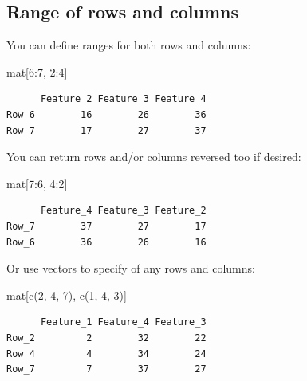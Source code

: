 \documentclass[
]{book}
\newenvironment{Shaded}{\begin{snugshade}}{\end{snugshade}}
\newcommand{\DecValTok}[1]{\textcolor[rgb]{0.00,0.00,0.81}{#1}}
\newcommand{\FunctionTok}[1]{\textcolor[rgb]{0.00,0.00,0.00}{#1}}
\newcommand{\NormalTok}[1]{#1}
\newcommand{\SpecialCharTok}[1]{\textcolor[rgb]{0.00,0.00,0.00}{#1}}
\begin{document}
\hypertarget{range-of-rows-and-columns}{%
\subsection{Range of rows and columns}\label{range-of-rows-and-columns}}

You can define ranges for both rows and columns:

\begin{Shaded}
\begin{Highlighting}[]
\NormalTok{mat[}\DecValTok{6}\SpecialCharTok{:}\DecValTok{7}\NormalTok{, }\DecValTok{2}\SpecialCharTok{:}\DecValTok{4}\NormalTok{]}
\end{Highlighting}
\end{Shaded}

\begin{verbatim}
      Feature_2 Feature_3 Feature_4
Row_6        16        26        36
Row_7        17        27        37
\end{verbatim}

You can return rows and/or columns reversed too if desired:

\begin{Shaded}
\begin{Highlighting}[]
\NormalTok{mat[}\DecValTok{7}\SpecialCharTok{:}\DecValTok{6}\NormalTok{, }\DecValTok{4}\SpecialCharTok{:}\DecValTok{2}\NormalTok{]}
\end{Highlighting}
\end{Shaded}

\begin{verbatim}
      Feature_4 Feature_3 Feature_2
Row_7        37        27        17
Row_6        36        26        16
\end{verbatim}

Or use vectors to specify of any rows and columns:

\begin{Shaded}
\begin{Highlighting}[]
\NormalTok{mat[}\FunctionTok{c}\NormalTok{(}\DecValTok{2}\NormalTok{, }\DecValTok{4}\NormalTok{, }\DecValTok{7}\NormalTok{), }\FunctionTok{c}\NormalTok{(}\DecValTok{1}\NormalTok{, }\DecValTok{4}\NormalTok{, }\DecValTok{3}\NormalTok{)]}
\end{Highlighting}
\end{Shaded}

\begin{verbatim}
      Feature_1 Feature_4 Feature_3
Row_2         2        32        22
Row_4         4        34        24
Row_7         7        37        27
\end{verbatim}
\end{document}
